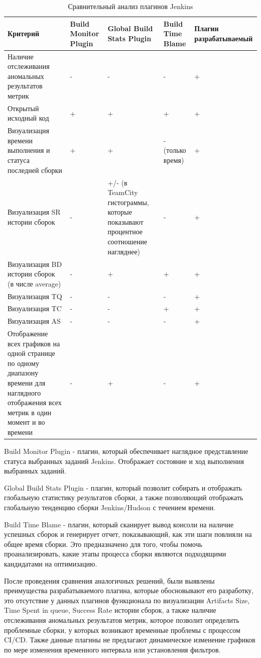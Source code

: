 \begin{table}
    \centering
    \caption{Сравнительный анализ плагинов Jenkins}
    \begin{tabular}{|p{5cm}|p{2cm}|p{3cm}|p{3cm}|p{2cm}|}
    \hline
        Критерий & Build Monitor Plugin & Global Build Stats Plugin  & Build Time Blame & Плагин разрабатываемый  \\ \hline
        Наличие отслеживания аномальных результатов метрик  & - & - & - & +  \\ \hline
        Открытый исходный код  & + &+ & + & +  \\ \hline
        Визуализация времени выполнения и статуса последней сборки & + &+ & - (только время) &+  \\ \hline
        Визуализация SR истории сборок & - & +/- (в TeamCity гистограммы, которые показывают процентное соотношение нагляднее) & - & +  \\ \hline
       Визуализация BD истории сборок (в числе average) & - & + & +  & +  \\ \hline
       Визуализация TQ & - & - & -  &+  \\ \hline
      Визуализация TC & - & - & +  & +  \\ \hline
      Визуализация AS & - &- &-  & +  \\ \hline
       Отображение всех графиков на одной странице по одному диапазону времени для наглядного отображения всех метрик в один момент и во времени & - & + & -  & +  \\ \hline


    \end{tabular}
\end{table}	

 Build Monitor Plugin - плагин, который обеспечивает наглядное представление статуса выбранных заданий Jenkins. Отображает состояние и ход выполнения выбранных заданий.
 
 Global Build Stats Plugin - плагин, который позволит собирать и отображать глобальную статистику результатов сборки, а также позволяющий отображать глобальную тенденцию сборки Jenkins/Hudson с течением времени.
 
  Build Time Blame - плагин, который сканирует вывод консоли на наличие успешных сборок и генерирует отчет, показывающий, как эти шаги повлияли на общее время сборки. Это предназначено для того, чтобы помочь проанализировать, какие этапы процесса сборки являются подходящими кандидатами на оптимизацию.
  
  После проведения сравнения аналогичных решений, были выявлены преимущества разрабатываемого плагина, которые обосновывают его разработку, это отсутствие у данных плагинов функционала по визуализации Artifacts Size, Time Spent in queue, Success Rate истории сборок, а также наличие отслеживания аномальных результатов метрик, которое позволит определить проблемные сборки, у которых возникают временные проблемы с процессом CI/CD. Также данные плагины не предлагают динамическое изменение графиков по мере изменения временного интервала или установления фильтров.



